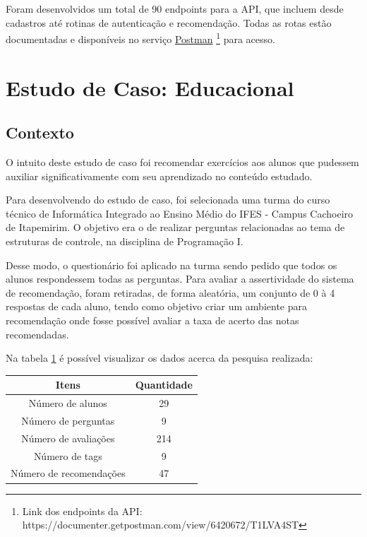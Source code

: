 Foram desenvolvidos um total de 90 endpoints para a API, que incluem desde cadastros até rotinas de autenticação e recomendação. Todas as rotas estão documentadas e disponíveis no serviço \href{https://documenter.getpostman.com/view/6420672/T1LVA4ST}{Postman} \footnote{Link dos endpoints da API: https://documenter.getpostman.com/view/6420672/T1LVA4ST} para acesso.

\section{Estudo de Caso: Educacional}

\subsection{Contexto}

O intuito deste estudo de caso foi recomendar exercícios aos alunos que pudessem auxiliar significativamente com seu aprendizado no conteúdo estudado.

Para desenvolvendo do estudo de caso, foi selecionada uma turma do curso técnico de Informática Integrado ao Ensino Médio do IFES - Campus Cachoeiro de Itapemirim. O objetivo era o de realizar perguntas relacionadas ao tema de estruturas de controle, na disciplina de Programação I.

Desse modo, o questionário foi aplicado na turma sendo pedido que todos os alunos respondessem todas as perguntas. Para avaliar a assertividade do sistema de recomendação, foram retiradas, de forma aleatória, um conjunto de 0 à 4 respostas de cada aluno, tendo como objetivo criar um ambiente para recomendação onde fosse possível avaliar a taxa de acerto das notas recomendadas.

Na tabela \ref{table:resultadosEstudoCasoEdu} é possível visualizar os dados acerca da pesquisa realizada:

\begin{table}[H]
\centering
\begin{tabular}{|c|c|}
\hline
\textbf{Itens}          & \textbf{Quantidade} \\ \hline
Número de alunos        & 29                  \\ \hline
Número de perguntas     & 9                   \\ \hline
Número de avaliações    & 214                 \\ \hline
Número de tags          & 9                   \\ \hline
Número de recomendações & 47                  \\ \hline
\end{tabular}
\label{table:resultadosEstudoCasoEdu} 
\end{table}

